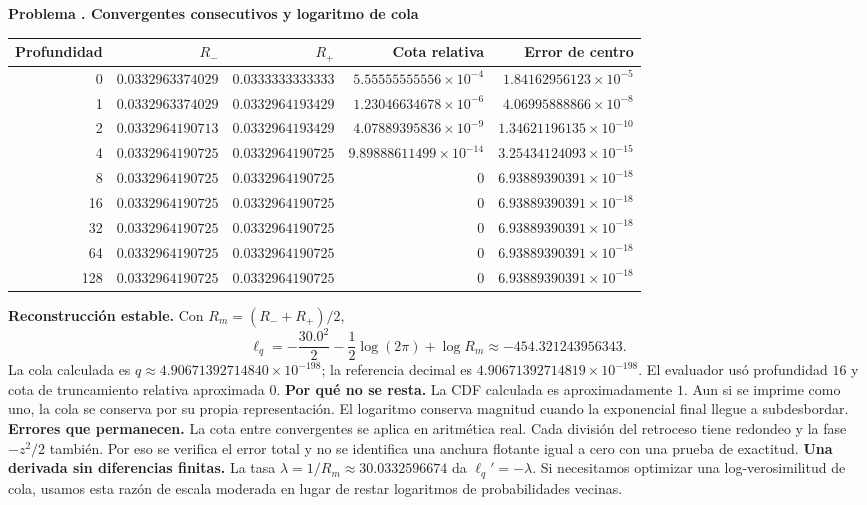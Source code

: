 \documentclass[11pt,a4paper]{article}
\theoremstyle{definition}
\newcounter{problema}
\newenvironment{resuelto}[1]{\refstepcounter{problema}\par\medskip\Needspace{6\baselineskip}\textbf{Problema \theproblema. #1}\par}{\par\medskip}
\begin{document}
\begin{resuelto}{Convergentes consecutivos y logaritmo de cola}
\begin{center}\small\begin{tabular}{rrrrr}
\toprule
Profundidad&$R_-$&$R_+$&Cota relativa&Error de centro\\
\midrule
0&$0.0332963374029$&$0.0333333333333$&$5.55555555556\times10^{-4}$&$1.84162956123\times10^{-5}$\\
1&$0.0332963374029$&$0.0332964193429$&$1.23046634678\times10^{-6}$&$4.06995888866\times10^{-8}$\\
2&$0.0332964190713$&$0.0332964193429$&$4.07889395836\times10^{-9}$&$1.34621196135\times10^{-10}$\\
4&$0.0332964190725$&$0.0332964190725$&$9.89888611499\times10^{-14}$&$3.25434124093\times10^{-15}$\\
8&$0.0332964190725$&$0.0332964190725$&$0$&$6.93889390391\times10^{-18}$\\
16&$0.0332964190725$&$0.0332964190725$&$0$&$6.93889390391\times10^{-18}$\\
32&$0.0332964190725$&$0.0332964190725$&$0$&$6.93889390391\times10^{-18}$\\
64&$0.0332964190725$&$0.0332964190725$&$0$&$6.93889390391\times10^{-18}$\\
128&$0.0332964190725$&$0.0332964190725$&$0$&$6.93889390391\times10^{-18}$\\
\bottomrule\end{tabular}\end{center}
\textbf{Reconstrucción estable.} Con $R_m=(R_-+R_+)/2$,
\[
\ell_q=-\frac{30.0^2}{2}-\frac12\log(2\pi)+\log R_m\approx-454.321243956343.
\]
La cola calculada es $q\approx4.90671392714840\times10^{-198}$; la referencia decimal es $4.90671392714819\times10^{-198}$. El evaluador usó profundidad $16$ y cota de truncamiento relativa aproximada $0$.
\textbf{Por qué no se resta.} La CDF calculada es aproximadamente $1$. Aun si se imprime como uno, la cola se conserva por su propia representación. El logaritmo conserva magnitud cuando la exponencial final llegue a subdesbordar.
\textbf{Errores que permanecen.} La cota entre convergentes se aplica en aritmética real. Cada división del retroceso tiene redondeo y la fase $-z^2/2$ también. Por eso se verifica el error total y no se identifica una anchura flotante igual a cero con una prueba de exactitud.
\textbf{Una derivada sin diferencias finitas.} La tasa $\lambda=1/R_m\approx30.0332596674$ da $\ell_q\prime=-\lambda$. Si necesitamos optimizar una log-verosimilitud de cola, usamos esta razón de escala moderada en lugar de restar logaritmos de probabilidades vecinas.
\end{resuelto}
\end{document}
